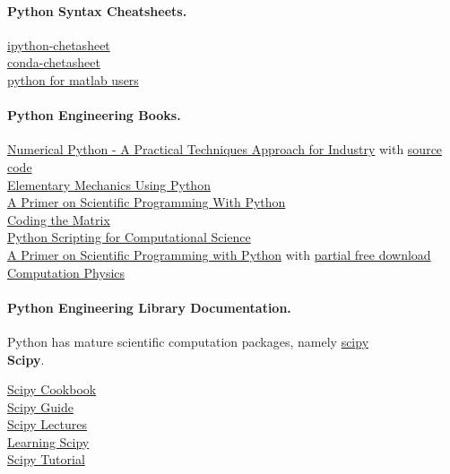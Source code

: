 \documentclass[%
oneside,                 %
final,                   %
10pt]{article}
\begin{document}
\paragraph{Python Syntax Cheatsheets.}
\href{{https://damontallen.github.io/IPython-quick-ref-sheets/}}{ipython-chetasheet} \\
\href{{http://conda.pydata.org/docs/using/cheatsheet.html}}{conda-chetasheet} \\
\href{{http://mathesaurus.sourceforge.net/matlab-numpy.html}}{python for matlab users} \\


\paragraph{Python Engineering Books.}
\href{{http://www.apress.com/9781484205549}}{Numerical Python - A Practical Techniques Approach for Industry} with \href{{http://www.apress.com/downloadable/download/sample/sample_id/1732/}}{source code}  \\
\href{{http://www.springer.com/us/book/9783319195957#aboutBook}}{Elementary Mechanics Using Python}   \\
\href{{http://hplgit.github.io/primer.html/doc/web/index.html}}{A Primer on Scientific Programming With Python}  \\
\href{{http://codingthematrix.com/}}{Coding the Matrix} \\
\href{{http://www.springer.com/us/book/9783540739159}}{Python Scripting for Computational Science} \\
\href{{http://www.springer.com/us/book/9783662498866}}{A Primer on Scientific Programming with Python}  with \href{{https://hplgit.github.io/primer.html/doc/pub/half/book.pdf}}{partial free download} \\
\href{{http://www-personal.umich.edu/~mejn/computational-physics/}}{Computation Physics} \\

\paragraph{Python Engineering Library Documentation.}
Python has mature scientific computation packages, namely \href{{https://www.scipy.org/}}{scipy} \\

\textbf{Scipy}.

\href{{http://scipy-cookbook.readthedocs.io/index.html}}{Scipy Cookbook}  \\
\href{{http://www.davekuhlman.org/scipy_guide_01.html}}{Scipy Guide}  \\
\href{{http://www.scipy-lectures.org/index.html}}{Scipy Lectures}   \\
\href{{https://github.com/rojassergio/Learning-Scipy}}{Learning Scipy}   \\
\href{{http://docs.scipy.org/doc/scipy/reference/tutorial/}}{Scipy Tutorial}   \\
\end{document}
